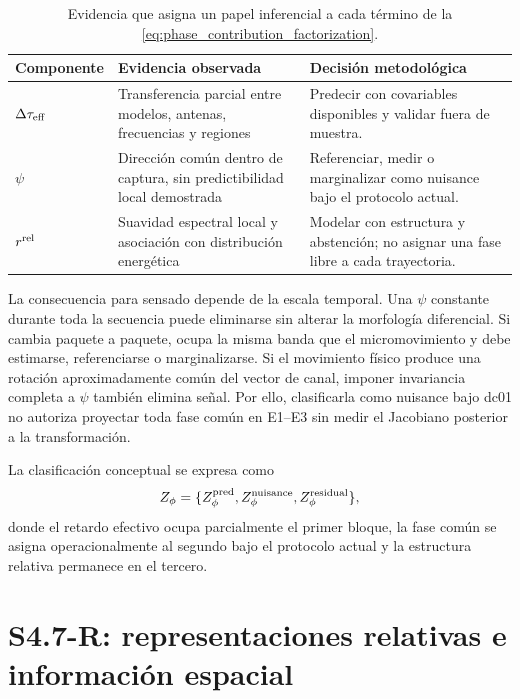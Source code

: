 \begin{table}[htbp]
\centering\small
\caption{Evidencia que asigna un papel inferencial a cada término de la
\cref{eq:phase_contribution_factorization}.}
\label{tab:phase_factor_roles}
\begin{tabularx}{\textwidth}{P{3.0cm}P{5.0cm}L}
\toprule
Componente & Evidencia observada & Decisión metodológica\\
\midrule
$\Delta\tau_{\rm eff}$ & Transferencia parcial entre modelos, antenas, frecuencias
y regiones & Predecir con covariables disponibles y validar fuera de muestra.\\
$\psi$ & Dirección común dentro de captura, sin predictibilidad local demostrada &
Referenciar, medir o marginalizar como nuisance bajo el protocolo actual.\\
$r^{\rm rel}$ & Suavidad espectral local y asociación con distribución energética &
Modelar con estructura y abstención; no asignar una fase libre a cada trayectoria.\\
\bottomrule
\end{tabularx}
\end{table}

La consecuencia para sensado depende de la escala temporal. Una $\psi$ constante
durante toda la secuencia puede eliminarse sin alterar la morfología diferencial.
Si cambia paquete a paquete, ocupa la misma banda que el micromovimiento y debe
estimarse, referenciarse o marginalizarse. Si el movimiento físico produce una
rotación aproximadamente común del vector de canal, imponer invariancia completa
a $\psi$ también elimina señal. Por ello, clasificarla como nuisance bajo dc01 no
autoriza proyectar toda fase común en E1--E3 sin medir el Jacobiano posterior a la
transformación.

La clasificación conceptual se expresa como
\begin{equation}
Z_\phi=\{Z_\phi^{\rm pred},Z_\phi^{\rm nuisance},Z_\phi^{\rm residual}\},
\label{eq:phase_latent_roles}
\end{equation}
donde el retardo efectivo ocupa parcialmente el primer bloque, la fase común se
asigna operacionalmente al segundo bajo el protocolo actual y la estructura
relativa permanece en el tercero.

\section{S4.7-R: representaciones relativas e información espacial}
\label{sec:s47r_results}

